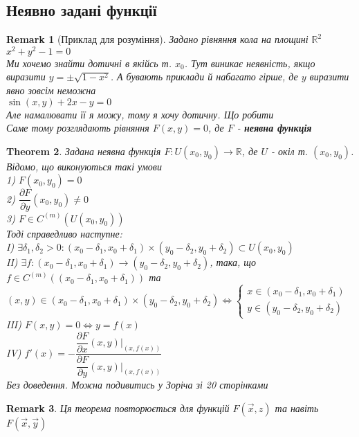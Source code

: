 \documentclass[a4paper, 14pt]{extarticle}
\def\departial#1#2{\dfrac{\partial {#1}}{\partial {#2}}}
\def\bigline{\vspace{5mm}\\}
\theoremstyle{theoremdd}
\newtheorem{theorem}{Theorem}[subsection]
\theoremstyle{theoremdd}
\theoremstyle{theoremdd}
\theoremstyle{theoremdd}
\newtheorem{remark}[theorem]{Remark}
\theoremstyle{theoremdd}
\theoremstyle{theoremdd}
\theoremstyle{theoremdd}
\begin{document}
\subsection{Неявно задані функції}
\begin{remark}[Приклад для розуміння]
Задано рівняння кола на площині $\mathbb{R}^2$ \\
$x^2+y^2-1=0$\\
Ми хочемо знайти дотичні в якійсь т. $x_0$. Тут виникає неявність, якщо виразити $y = \pm \sqrt{1-x^2}$. А бувають приклади й набагато гірше, де $y$ виразити явно зовсім неможна\\
$\sin(x,y)+2x-y=0$\\
Але намалювати її я можу, тому я хочу дотичну. Що робити
\bigline
Саме тому розглядають рівняння $F(x,y) = 0$, де $F$ - \textbf{неявна функція}
\end{remark}

\begin{theorem}
Задана неявна функція $F: U(x_0,y_0) \to \mathbb{R}$, де $U$ - окіл т. $(x_0,y_0)$. Відомо, що виконуються такі умови\\
1) $F(x_0,y_0)=0$\\
2) $\departial{F}{y}(x_0,y_0) \neq 0$\\
3) $F \in C^{(m)}(U(x_0,y_0))$\\
Тоді справедливо наступне:\\
I) $\exists \delta_1,\delta_2 > 0: (x_0-\delta_1,x_0+\delta_1) \times (y_0-\delta_2,y_0+\delta_2) \subset U(x_0,y_0)$\\
II) $\exists f: (x_0-\delta_1,x_0+\delta_1) \to (y_0-\delta_2,y_0+\delta_2)$, така, що \\ $f \in C^{(m)}((x_0-\delta_1,x_0+\delta_1))$ та\\
$(x,y) \in (x_0-\delta_1,x_0+\delta_1) \times (y_0-\delta_2,y_0+\delta_2) \iff \begin{cases} x \in (x_0-\delta_1,x_0+\delta_1) \\ y \in (y_0-\delta_2,y_0+\delta_2) \end{cases}$\\
III) $F(x,y) = 0 \iff y=f(x)$\\
IV) $f'(x) = -\dfrac{\departial{F}{x}(x,y) \Big|_{(x,f(x))}}{\departial{F}{y}(x,y) \Big|_{(x,f(x))}}$\\
\textit{Без доведення. Можна подивитись у Зоріча зі 20 сторінками}
\end{theorem}

\begin{remark}
Ця теорема повторюється для функцій $F(\vec{x},z)$ та навіть $F(\vec{x}, \vec{y})$
\end{remark}
\end{document}
